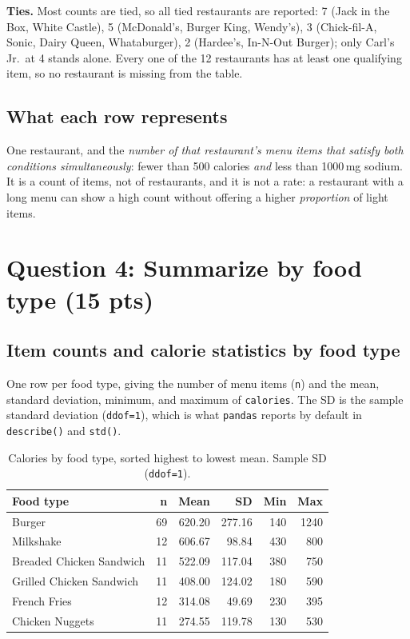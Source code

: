 \documentclass[11pt]{article}
\newcommand{\question}[2]{%
  \section*{\color{headblue}#1 \hfill \normalfont\small(#2)}}
\begin{document}
\noindent
\textbf{Ties.} Most counts are tied, so all tied restaurants are reported: 7 (Jack in the
Box, White Castle), 5 (McDonald's, Burger King, Wendy's), 3 (Chick-fil-A, Sonic, Dairy Queen,
Whataburger), 2 (Hardee's, In-N-Out Burger); only Carl's Jr.\ at 4 stands alone. Every one of
the 12 restaurants has at least one qualifying item, so no restaurant is missing from the table.

\subsection*{What each row represents}

One restaurant, and the \emph{number of that
restaurant's menu items that satisfy both conditions simultaneously}: fewer than 500
calories \emph{and} less than 1000\,mg sodium. It is a count of items, not of restaurants,
and it is not a rate: a restaurant with a long menu can show a high count without
offering a higher \emph{proportion} of light items.

\clearpage
\question{Question 4: Summarize by food type}{15 pts}

\subsection*{Item counts and calorie statistics by food type}

One row per food type, giving the number of menu items (\texttt{n}) and the mean, standard
deviation, minimum, and maximum of \texttt{calories}. The SD is the sample standard
deviation (\texttt{ddof=1}), which is what \texttt{pandas} reports by default in
\texttt{describe()} and \texttt{std()}.

\begin{table}[H]\centering\small
\begin{tabular}{lrrrrr}
\toprule
Food type & n & Mean & SD & Min & Max \\
\midrule
Burger                   & 69 & 620.20 & 277.16 & 140 & 1240 \\
Milkshake                & 12 & 606.67 & 98.84  & 430 & 800  \\
Breaded Chicken Sandwich & 11 & 522.09 & 117.04 & 380 & 750  \\
Grilled Chicken Sandwich & 11 & 408.00 & 124.02 & 180 & 590  \\
French Fries             & 12 & 314.08 & 49.69  & 230 & 395  \\
Chicken Nuggets          & 11 & 274.55 & 119.78 & 130 & 530  \\
\bottomrule
\end{tabular}
\caption{Calories by food type, sorted highest to lowest mean. Sample SD (\texttt{ddof=1}).}
\end{table}
\end{document}

